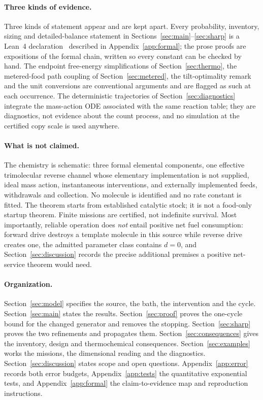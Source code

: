 \documentclass[11pt,a4paper]{article}
\theoremstyle{plain}
\theoremstyle{definition}
\theoremstyle{remark}
\begin{document}
\paragraph{Three kinds of evidence.}
Three kinds of statement appear and are kept apart. Every probability, inventory, sizing and detailed-balance statement in Sections~\ref{sec:main}--\ref{sec:sharp} is a Lean~4 declaration~\citep{demoura2021,mathlib2020} described in Appendix~\ref{app:formal}; the prose proofs are expositions of the formal chain, written so every constant can be checked by hand. The endpoint free-energy simplifications of Section~\ref{sec:thermo}, the metered-food path coupling of Section~\ref{sec:metered}, the tilt-optimality remark and the unit conversions are conventional arguments and are flagged as such at each occurrence. The deterministic trajectories of Section~\ref{sec:diagnostics} integrate the mass-action ODE associated with the same reaction table; they are diagnostics, not evidence about the count process, and no simulation at the certified copy scale is used anywhere.

\paragraph{What is not claimed.}
The chemistry is schematic: three formal elemental components, one effective trimolecular reverse channel whose elementary implementation is not supplied, ideal mass action, instantaneous interventions, and externally implemented feeds, withdrawals and collection. No molecule is identified and no rate constant is fitted. The theorem starts from established catalytic stock; it is not a food-only startup theorem. Finite missions are certified, not indefinite survival. Most importantly, reliable operation does \emph{not} entail positive net fuel consumption: forward drive destroys a template molecule in this source while reverse drive creates one, the admitted parameter class contains $d=0$, and Section~\ref{sec:discussion} records the precise additional premises a positive net-service theorem would need.

\paragraph{Organization.}
Section~\ref{sec:model} specifies the source, the bath, the intervention and the cycle. Section~\ref{sec:main} states the results. Section~\ref{sec:proof} proves the one-cycle bound for the changed generator and removes the stopping. Section~\ref{sec:sharp} proves the two refinements and propagates them. Section~\ref{sec:consequences} gives the inventory, design and thermochemical consequences. Section~\ref{sec:examples} works the missions, the dimensional reading and the diagnostics. Section~\ref{sec:discussion} states scope and open questions. Appendix~\ref{app:error} records both error budgets, Appendix~\ref{app:tests} the quantitative exponential tests, and Appendix~\ref{app:formal} the claim-to-evidence map and reproduction instructions.
\end{document}
